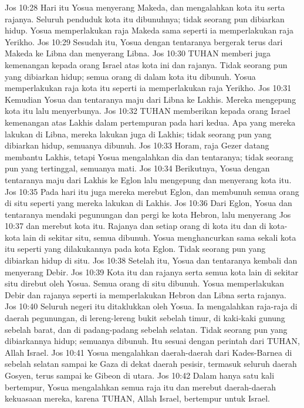 Jos 10:28  Hari itu Yosua menyerang Makeda, dan mengalahkan kota itu serta rajanya. Seluruh penduduk kota itu dibunuhnya; tidak seorang pun dibiarkan hidup. Yosua memperlakukan raja Makeda sama seperti ia memperlakukan raja Yerikho.
Jos 10:29  Sesudah itu, Yosua dengan tentaranya bergerak terus dari Makeda ke Libna dan menyerang Libna.
Jos 10:30  TUHAN memberi juga kemenangan kepada orang Israel atas kota ini dan rajanya. Tidak seorang pun yang dibiarkan hidup; semua orang di dalam kota itu dibunuh. Yosua memperlakukan raja kota itu seperti ia memperlakukan raja Yerikho.
Jos 10:31  Kemudian Yosua dan tentaranya maju dari Libna ke Lakhis. Mereka mengepung kota itu lalu menyerbunya.
Jos 10:32  TUHAN memberikan kepada orang Israel kemenangan atas Lakhis dalam pertempuran pada hari kedua. Apa yang mereka lakukan di Libna, mereka lakukan juga di Lakhis; tidak seorang pun yang dibiarkan hidup, semuanya dibunuh.
Jos 10:33  Horam, raja Gezer datang membantu Lakhis, tetapi Yosua mengalahkan dia dan tentaranya; tidak seorang pun yang tertinggal, semuanya mati.
Jos 10:34  Berikutnya, Yosua dengan tentaranya maju dari Lakhis ke Eglon lalu mengepung dan menyerang kota itu.
Jos 10:35  Pada hari itu juga mereka merebut Eglon, dan membunuh semua orang di situ seperti yang mereka lakukan di Lakhis.
Jos 10:36  Dari Eglon, Yosua dan tentaranya mendaki pegunungan dan pergi ke kota Hebron, lalu menyerang
Jos 10:37  dan merebut kota itu. Rajanya dan setiap orang di kota itu dan di kota-kota lain di sekitar situ, semua dibunuh. Yosua menghancurkan sama sekali kota itu seperti yang dilakukannya pada kota Eglon. Tidak seorang pun yang dibiarkan hidup di situ.
Jos 10:38  Setelah itu, Yosua dan tentaranya kembali dan menyerang Debir.
Jos 10:39  Kota itu dan rajanya serta semua kota lain di sekitar situ direbut oleh Yosua. Semua orang di situ dibunuh. Yosua memperlakukan Debir dan rajanya seperti ia memperlakukan Hebron dan Libna serta rajanya.
Jos 10:40  Seluruh negeri itu ditaklukkan oleh Yosua. Ia mengalahkan raja-raja di daerah pegunungan, di lereng-lereng bukit sebelah timur, di kaki-kaki gunung sebelah barat, dan di padang-padang sebelah selatan. Tidak seorang pun yang dibiarkannya hidup; semuanya dibunuh. Itu sesuai dengan perintah dari TUHAN, Allah Israel.
Jos 10:41  Yosua mengalahkan daerah-daerah dari Kades-Barnea di sebelah selatan sampai ke Gaza di dekat daerah pesisir, termasuk seluruh daerah Gosyen, terus sampai ke Gibeon di utara.
Jos 10:42  Dalam hanya satu kali bertempur, Yosua mengalahkan semua raja itu dan merebut daerah-daerah kekuasaan mereka, karena TUHAN, Allah Israel, bertempur untuk Israel.
